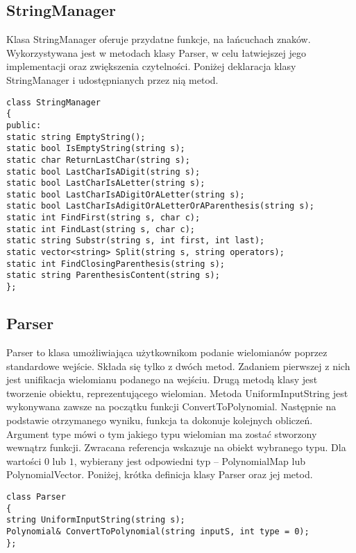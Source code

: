 \subsection{StringManager}

Klasa StringManager oferuje przydatne funkcje, na łańcuchach znaków. Wykorzystywana jest w metodach klasy Parser, w celu łatwiejszej jego implementacji oraz zwiększenia czytelności. Poniżej deklaracja klasy StringManager i udostępnianych przez nią metod.

\begin{lstlisting}
class StringManager
{
public:
static string EmptyString();
static bool IsEmptyString(string s);
static char ReturnLastChar(string s);
static bool LastCharIsADigit(string s);
static bool LastCharIsALetter(string s);
static bool LastCharIsADigitOrALetter(string s);
static bool LastCharIsAdigitOrALetterOrAParenthesis(string s);
static int FindFirst(string s, char c);
static int FindLast(string s, char c);
static string Substr(string s, int first, int last);
static vector<string> Split(string s, string operators);
static int FindClosingParenthesis(string s);
static string ParenthesisContent(string s);
};
\end{lstlisting}


\subsection{Parser}
Parser to klasa umożliwiająca użytkownikom podanie wielomianów poprzez standardowe wejście. Składa się tylko z dwóch metod. Zadaniem pierwszej z nich jest unifikacja wielomianu podanego na wejściu. Drugą metodą klasy jest tworzenie obiektu, reprezentującego wielomian. Metoda UniformInputString jest wykonywana zawsze na początku funkcji ConvertToPolynomial. Następnie na podstawie otrzymanego wyniku, funkcja ta dokonuje kolejnych obliczeń. Argument type mówi o tym jakiego typu wielomian ma zostać stworzony wewnątrz funkcji. Zwracana referencja wskazuje na obiekt wybranego typu. Dla wartości $0$ lub $1$, wybierany jest odpowiedni typ -- PolynomialMap lub PolynomialVector. Poniżej, krótka definicja klasy Parser oraz jej metod.

\begin{lstlisting}
class Parser
{
string UniformInputString(string s);
Polynomial& ConvertToPolynomial(string inputS, int type = 0);
};
\end{lstlisting}


